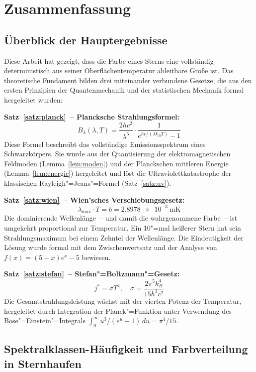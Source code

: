 ﻿\documentclass[a4paper,12pt]{article}
\theoremstyle{definition}
\begin{document}
\section{Zusammenfassung}

\subsection{Überblick der Hauptergebnisse}

Diese Arbeit hat gezeigt, dass die Farbe eines Sterns eine vollständig
deterministisch aus seiner Oberflächentemperatur ableitbare Größe ist.
Das theoretische Fundament bilden drei miteinander verbundene Gesetze,
die aus den ersten Prinzipien der Quantenmechanik und der statistischen
Mechanik formal hergeleitet wurden:

\textbf{Satz~\ref{satz:planck}~-- Plancksche Strahlungsformel:}
\[
    B_\lambda(\lambda, T) = \frac{2hc^2}{\lambda^5} \cdot
    \frac{1}{e^{hc/(\lambda k_B T)} - 1}
\]
Diese Formel beschreibt das vollständige Emissionsspektrum eines Schwarzkörpers.
Sie wurde aus der Quantisierung der elektromagnetischen Feldmoden
(Lemma~\ref{lem:moden}) und der Planckschen mittleren Energie
(Lemma~\ref{lem:energie}) hergeleitet und löst die Ultraviolettkatastrophe
der klassischen Rayleigh"=Jeans"=Formel (Satz~\ref{satz:uv}).

\textbf{Satz~\ref{satz:wien}~-- Wien'sches Verschiebungsgesetz:}
\[
    \lambda_{\max} \cdot T = b = \SI{2.8978e-3}{\metre\kelvin}
\]
Die dominierende Wellenlänge~-- und damit die wahrgenommene Farbe~-- ist
umgekehrt proportional zur Temperatur. Ein 10"=mal heißerer Stern hat sein
Strahlungsmaximum bei einem Zehntel der Wellenlänge.
Die Eindeutigkeit der Lösung wurde formal mit dem Zwischenwertsatz und
der Analyse von $f(x) = (5-x)e^x - 5$ bewiesen.

\textbf{Satz~\ref{satz:stefan}~-- Stefan"=Boltzmann"=Gesetz:}
\[
    j^* = \sigma T^4, \quad
    \sigma = \frac{2\pi^5 k_B^4}{15 h^3 c^2}
\]
Die Gesamtstrahlungsleistung wächst mit der vierten Potenz der Temperatur,
hergeleitet durch Integration der Planck"=Funktion unter Verwendung
des Bose"=Einstein"=Integrals $\int_0^\infty u^3/(e^u-1)\,du = \pi^4/15$.

\subsection{Spektralklassen-Häufigkeit und Farbverteilung in Sternhaufen}
\end{document}
